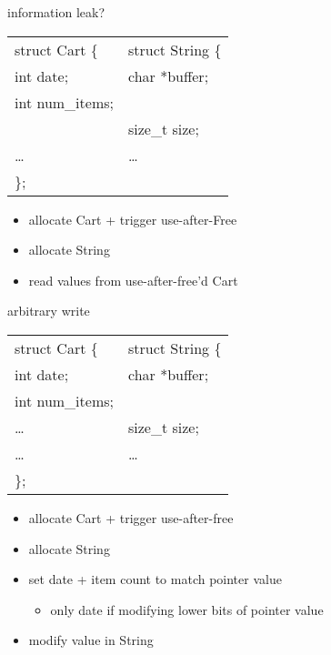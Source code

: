 \begin{frame}{information leak?}
{\tt\begin{tabular}{l|l} 
struct Cart \{ & struct String \{ \\
int date; & char *buffer; \\
int num\_items; &  ~ \\ 
    ~         & size\_t size; \\
    \ldots & \ldots \\
\};
\end{tabular}
}
\begin{itemize}
\item allocate Cart + trigger use-after-Free
\item allocate String
\item read values from use-after-free'd Cart
\end{itemize}
\end{frame}

\begin{frame}{arbitrary write}
{\tt\begin{tabular}{l|l} 
struct Cart \{ & struct String \{ \\
int date; & char *buffer; \\
int num\_items; &  ~ \\ 
\ldots & size\_t size; \\
\ldots & \ldots \\
\};
\end{tabular}
}
\begin{itemize}
\item allocate Cart + trigger use-after-free
\item allocate String
\item set date + item count to match pointer value
    \begin{itemize}
    \item only date if modifying lower bits of pointer value
    \end{itemize}
\item modify value in String
\end{itemize}
\end{frame}

